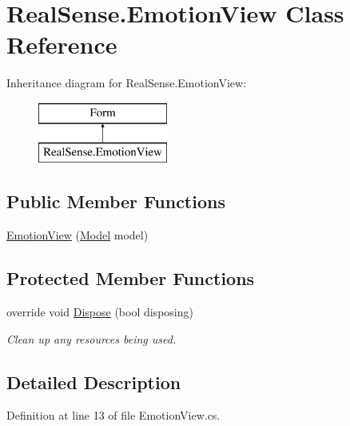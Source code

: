 \hypertarget{class_real_sense_1_1_emotion_view}{}\section{Real\+Sense.\+Emotion\+View Class Reference}
\label{class_real_sense_1_1_emotion_view}
Inheritance diagram for Real\+Sense.\+Emotion\+View\+:\begin{figure}[H]
\begin{center}
\leavevmode
\includegraphics[height=2.000000cm]{class_real_sense_1_1_emotion_view}
\end{center}
\end{figure}
\subsection*{Public Member Functions}
\begin{DoxyCompactItemize}
\item 
\hyperlink{class_real_sense_1_1_emotion_view_a6f0e3d2564b7ecfea7c153faf76b53a6}{Emotion\+View} (\hyperlink{class_real_sense_1_1_model}{Model} model)
\end{DoxyCompactItemize}
\subsection*{Protected Member Functions}
\begin{DoxyCompactItemize}
\item 
override void \hyperlink{class_real_sense_1_1_emotion_view_a544db73a74ee3f66ec3c810121e45bc4}{Dispose} (bool disposing)
\begin{DoxyCompactList}\small\item\em Clean up any resources being used. \end{DoxyCompactList}\end{DoxyCompactItemize}


\subsection{Detailed Description}


Definition at line 13 of file Emotion\+View.\+cs.



